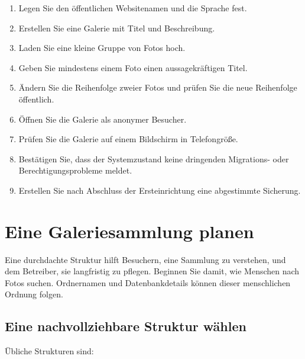 \documentclass[11pt,a4paper]{article}
\begin{document}
\begin{enumerate}
  \item Legen Sie den öffentlichen Websitenamen und die Sprache fest.
  \item Erstellen Sie eine Galerie mit Titel und Beschreibung.
  \item Laden Sie eine kleine Gruppe von Fotos hoch.
  \item Geben Sie mindestens einem Foto einen aussagekräftigen Titel.
  \item Ändern Sie die Reihenfolge zweier Fotos und prüfen Sie die neue
  Reihenfolge öffentlich.
  \item Öffnen Sie die Galerie als anonymer Besucher.
  \item Prüfen Sie die Galerie auf einem Bildschirm in Telefongröße.
  \item Bestätigen Sie, dass der Systemzustand keine dringenden Migrations- oder
  Berechtigungsprobleme meldet.
  \item Erstellen Sie nach Abschluss der Ersteinrichtung eine abgestimmte
  Sicherung.
\end{enumerate}

\section{Eine Galeriesammlung planen}
\label{sec:planning}

Eine durchdachte Struktur hilft Besuchern, eine Sammlung zu verstehen, und dem
Betreiber, sie langfristig zu pflegen. Beginnen Sie damit, wie Menschen nach
Fotos suchen. Ordnernamen und Datenbankdetails können dieser menschlichen
Ordnung folgen.

\subsection{Eine nachvollziehbare Struktur wählen}

Übliche Strukturen sind:
\end{document}
